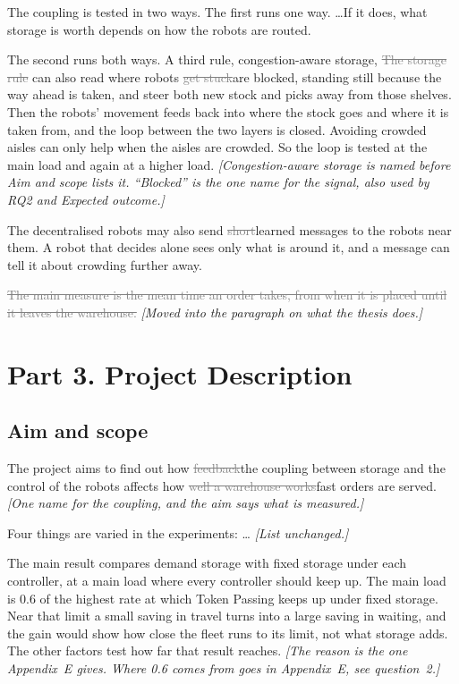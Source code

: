 \documentclass[11pt,a4paper]{article}
\newcommand{\new}[1]{\textcolor{newc}{#1}}
\newcommand{\old}[1]{\textcolor{gray}{\sout{#1}}}
\newcommand{\note}[1]{{\small\itshape [#1]}}
\begin{document}
The coupling is tested in two ways. The first runs one way. \ldots If it
does, what storage is worth depends on how the robots are routed.

The second runs both ways. \new{A third rule, congestion-aware storage,}
\old{The storage rule} can also read where robots \old{get stuck}\new{are
blocked, standing still because the way ahead is taken}, and steer both new
stock and picks away from those shelves. Then the robots' movement feeds
back into where the stock goes and where it is taken from, and the loop
between the two layers is closed. Avoiding crowded aisles can only help
when the aisles are crowded. So the loop is tested at the main load and
again at a higher load.
\note{Congestion-aware storage is named before Aim and scope lists it.
``Blocked'' is the one name for the signal, also used by RQ2 and Expected
outcome.}

The decentralised robots may also send \old{short}\new{learned} messages to
the robots near them. A robot that decides alone sees only what is around
it, and a message can tell it about crowding further away.

\old{The main measure is the mean time an order takes, from when it is placed
until it leaves the warehouse.}
\note{Moved into the paragraph on what the thesis does.}

\section*{Part 3. Project Description}

\subsection*{Aim and scope}

The project aims to find out how \old{feedback}\new{the coupling} between
storage and the control of the robots affects how \old{well a warehouse
works}\new{fast orders are served}.
\note{One name for the coupling, and the aim says what is measured.}

Four things are varied in the experiments: \ldots
\note{List unchanged.}

The main result compares demand storage with fixed storage under each
controller, at a main load where every controller should keep up. \new{The
main load is 0.6 of the highest rate at which Token Passing keeps up under
fixed storage. Near that limit a small saving in travel turns into a large
saving in waiting, and the gain would show how close the fleet runs to its
limit, not what storage adds.} The other factors test how far that result
reaches.
\note{The reason is the one Appendix~E gives. Where 0.6 comes from goes in
Appendix~E, see question~2.}
\end{document}
